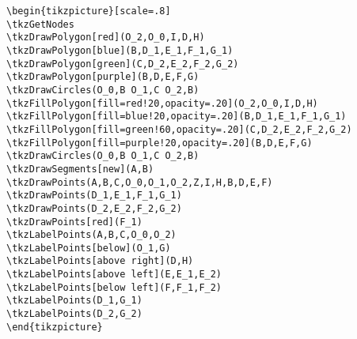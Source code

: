 \begin{Verbatim}
\begin{tikzpicture}[scale=.8]
\tkzGetNodes
\tkzDrawPolygon[red](O_2,O_0,I,D,H)
\tkzDrawPolygon[blue](B,D_1,E_1,F_1,G_1)
\tkzDrawPolygon[green](C,D_2,E_2,F_2,G_2)
\tkzDrawPolygon[purple](B,D,E,F,G)
\tkzDrawCircles(O_0,B O_1,C O_2,B)
\tkzFillPolygon[fill=red!20,opacity=.20](O_2,O_0,I,D,H)
\tkzFillPolygon[fill=blue!20,opacity=.20](B,D_1,E_1,F_1,G_1)
\tkzFillPolygon[fill=green!60,opacity=.20](C,D_2,E_2,F_2,G_2)
\tkzFillPolygon[fill=purple!20,opacity=.20](B,D,E,F,G)
\tkzDrawCircles(O_0,B O_1,C O_2,B)
\tkzDrawSegments[new](A,B)
\tkzDrawPoints(A,B,C,O_0,O_1,O_2,Z,I,H,B,D,E,F)
\tkzDrawPoints(D_1,E_1,F_1,G_1)
\tkzDrawPoints(D_2,E_2,F_2,G_2)
\tkzDrawPoints[red](F_1)
\tkzLabelPoints(A,B,C,O_0,O_2)
\tkzLabelPoints[below](O_1,G)
\tkzLabelPoints[above right](D,H)
\tkzLabelPoints[above left](E,E_1,E_2)
\tkzLabelPoints[below left](F,F_1,F_2)
\tkzLabelPoints(D_1,G_1)
\tkzLabelPoints(D_2,G_2)
\end{tikzpicture}
\end{Verbatim}

